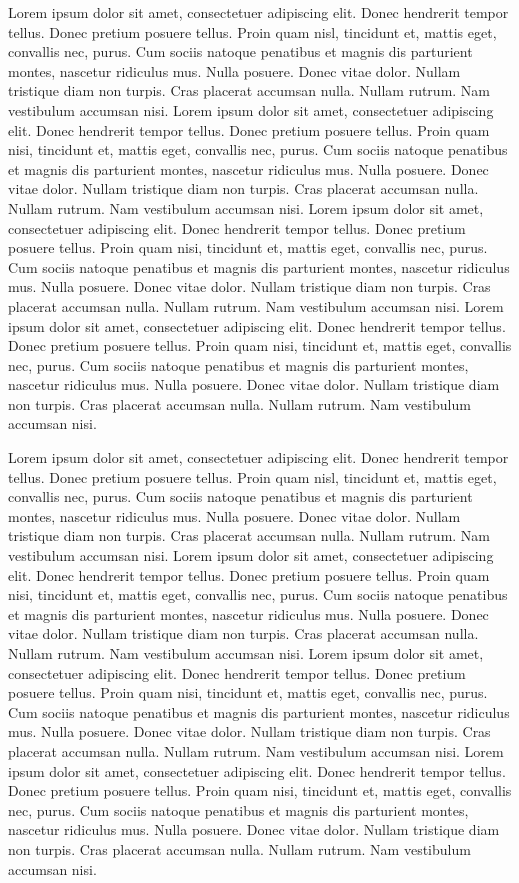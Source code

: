 \documentclass[12pt]{report}
\begin{document}
Lorem ipsum dolor sit amet, consectetuer adipiscing elit. Donec
hendrerit tempor tellus. Donec pretium posuere tellus. Proin quam
nisl, tincidunt et, mattis eget, convallis nec, purus. Cum sociis
natoque penatibus et magnis dis parturient montes, nascetur ridiculus
mus. Nulla posuere. Donec vitae dolor. Nullam tristique diam non
turpis. Cras placerat accumsan nulla. Nullam rutrum. Nam vestibulum
accumsan nisi.  Lorem ipsum dolor sit amet, consectetuer adipiscing
elit. Donec hendrerit tempor tellus. Donec pretium posuere
tellus. Proin quam nisi, tincidunt et, mattis eget, convallis nec,
purus. Cum sociis natoque penatibus et magnis dis parturient montes,
nascetur ridiculus mus. Nulla posuere. Donec vitae dolor. Nullam
tristique diam non turpis. Cras placerat accumsan nulla. Nullam
rutrum. Nam vestibulum accumsan nisi.  Lorem ipsum dolor sit amet,
consectetuer adipiscing elit. Donec hendrerit tempor tellus. Donec
pretium posuere tellus. Proin quam nisi, tincidunt et, mattis eget,
convallis nec, purus. Cum sociis natoque penatibus et magnis dis
parturient montes, nascetur ridiculus mus. Nulla posuere. Donec vitae
dolor. Nullam tristique diam non turpis. Cras placerat accumsan
nulla. Nullam rutrum. Nam vestibulum accumsan nisi.  Lorem ipsum dolor
sit amet, consectetuer adipiscing elit. Donec hendrerit tempor
tellus. Donec pretium posuere tellus. Proin quam nisi, tincidunt et,
mattis eget, convallis nec, purus. Cum sociis natoque penatibus et
magnis dis parturient montes, nascetur ridiculus mus. Nulla
posuere. Donec vitae dolor. Nullam tristique diam non turpis. Cras
placerat accumsan nulla. Nullam rutrum. Nam vestibulum accumsan nisi.

Lorem ipsum dolor sit amet, consectetuer adipiscing elit. Donec
hendrerit tempor tellus. Donec pretium posuere tellus. Proin quam
nisl, tincidunt et, mattis eget, convallis nec, purus. Cum sociis
natoque penatibus et magnis dis parturient montes, nascetur ridiculus
mus. Nulla posuere. Donec vitae dolor. Nullam tristique diam non
turpis. Cras placerat accumsan nulla. Nullam rutrum. Nam vestibulum
accumsan nisi.  Lorem ipsum dolor sit amet, consectetuer adipiscing
elit. Donec hendrerit tempor tellus. Donec pretium posuere
tellus. Proin quam nisi, tincidunt et, mattis eget, convallis nec,
purus. Cum sociis natoque penatibus et magnis dis parturient montes,
nascetur ridiculus mus. Nulla posuere. Donec vitae dolor. Nullam
tristique diam non turpis. Cras placerat accumsan nulla. Nullam
rutrum. Nam vestibulum accumsan nisi.  Lorem ipsum dolor sit amet,
consectetuer adipiscing elit. Donec hendrerit tempor tellus. Donec
pretium posuere tellus. Proin quam nisi, tincidunt et, mattis eget,
convallis nec, purus. Cum sociis natoque penatibus et magnis dis
parturient montes, nascetur ridiculus mus. Nulla posuere. Donec vitae
dolor. Nullam tristique diam non turpis. Cras placerat accumsan
nulla. Nullam rutrum. Nam vestibulum accumsan nisi.  Lorem ipsum dolor
sit amet, consectetuer adipiscing elit. Donec hendrerit tempor
tellus. Donec pretium posuere tellus. Proin quam nisi, tincidunt et,
mattis eget, convallis nec, purus. Cum sociis natoque penatibus et
magnis dis parturient montes, nascetur ridiculus mus. Nulla
posuere. Donec vitae dolor. Nullam tristique diam non turpis. Cras
placerat accumsan nulla. Nullam rutrum. Nam vestibulum accumsan nisi.
\end{document}
